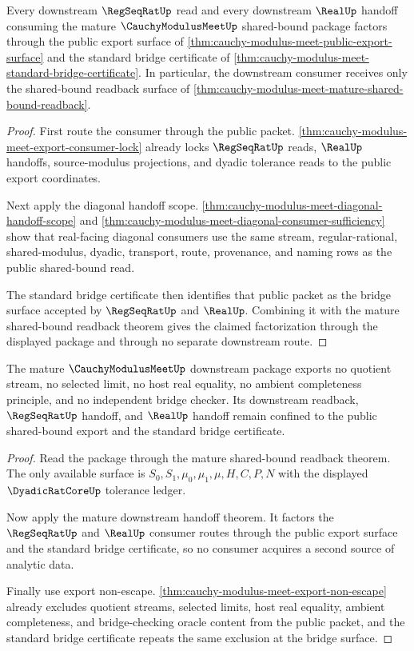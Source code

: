\begin{theorem}
\label{thm:cauchy-modulus-meet-mature-downstream-handoff}
Every downstream $\RegSeqRatUp$ read and every downstream $\RealUp$ handoff consuming the mature $\CauchyModulusMeetUp$ shared-bound package factors through the public export surface of \autoref{thm:cauchy-modulus-meet-public-export-surface} and the standard bridge certificate of \autoref{thm:cauchy-modulus-meet-standard-bridge-certificate}. In particular, the downstream consumer receives only the shared-bound readback surface of \autoref{thm:cauchy-modulus-meet-mature-shared-bound-readback}.
\end{theorem}
\begin{proof}
First route the consumer through the public packet. \autoref{thm:cauchy-modulus-meet-export-consumer-lock} already locks $\RegSeqRatUp$ reads, $\RealUp$ handoffs, source-modulus projections, and dyadic tolerance reads to the public export coordinates.

Next apply the diagonal handoff scope. \autoref{thm:cauchy-modulus-meet-diagonal-handoff-scope} and \autoref{thm:cauchy-modulus-meet-diagonal-consumer-sufficiency} show that real-facing diagonal consumers use the same stream, regular-rational, shared-modulus, dyadic, transport, route, provenance, and naming rows as the public shared-bound read.

The standard bridge certificate then identifies that public packet as the bridge surface accepted by $\RegSeqRatUp$ and $\RealUp$. Combining it with the mature shared-bound readback theorem gives the claimed factorization through the displayed package and through no separate downstream route.
\end{proof}

\begin{theorem}
\label{thm:cauchy-modulus-meet-mature-nonescape}
The mature $\CauchyModulusMeetUp$ downstream package exports no quotient stream, no selected limit, no host real equality, no ambient completeness principle, and no independent bridge checker. Its downstream readback, $\RegSeqRatUp$ handoff, and $\RealUp$ handoff remain confined to the public shared-bound export and the standard bridge certificate.
\end{theorem}
\begin{proof}
Read the package through the mature shared-bound readback theorem. The only available surface is $S_0,S_1,\mu_0,\mu_1,\mu,H,C,P,N$ with the displayed $\DyadicRatCoreUp$ tolerance ledger.

Now apply the mature downstream handoff theorem. It factors the $\RegSeqRatUp$ and $\RealUp$ consumer routes through the public export surface and the standard bridge certificate, so no consumer acquires a second source of analytic data.

Finally use export non-escape. \autoref{thm:cauchy-modulus-meet-export-non-escape} already excludes quotient streams, selected limits, host real equality, ambient completeness, and bridge-checking oracle content from the public packet, and the standard bridge certificate repeats the same exclusion at the bridge surface.
\end{proof}


